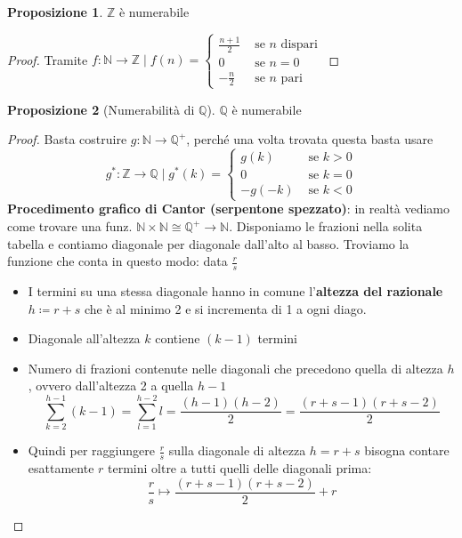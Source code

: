 \documentclass[a4paper,10pt]{article}
\theoremstyle{definition}
\newcommand{\na}{\mathbb{N}} %
\newcommand{\za}{\mathbb{Z}} %
\newcommand{\qu}{\mathbb{Q}} %
\theoremstyle{indentdefinition}
\theoremstyle{indentpostulate}
\theoremstyle{indenttheorem}
\newtheorem{prop}{Proposizione}[section]
\theoremstyle{myremark}
\theoremstyle{indentgeneral}
\begin{document}
\begin{prop}
    $\za$ è numerabile
\end{prop}

\begin{proof}
    Tramite $f:\na\to\za\mid f(n)=\begin{cases}
        \frac{n+1}{2} & \text{ se $n$ dispari}\\
        0 & \text{ se $n=0$}\\
        -\frac{n}{2} & \text{ se $n$ pari}
    \end{cases}$
\end{proof}

\begin{prop}[Numerabilità di $\qu$]\label{q-numerabile}
    $\qu$ è numerabile
\end{prop}

\begin{proof} Basta costruire  $g:\na\to \qu^+$, perché una volta trovata questa basta usare
 $$g^*:\za\to\qu\mid g^*(k)=\begin{cases}
        g(k) & \text{ se $k>0$}\\
        0 & \text{ se $k=0$}\\
        -g(-k) & \text{ se $k<0$}
    \end{cases}$$
    \textbf{Procedimento grafico di Cantor (serpentone spezzato)}: in realtà vediamo come trovare una funz. $\na\times\na\cong\qu^+\to \na$. Disponiamo le frazioni nella solita tabella e contiamo diagonale per diagonale dall'alto al basso. Troviamo la funzione che conta in questo modo: data  $\frac{r}{s}$
    \begin{itemize}
        \item I termini su una stessa diagonale hanno in comune l'\textbf{altezza del razionale} $h\coloneqq r+s$ che è al minimo 2 e si incrementa di 1 a ogni diago.
        \item Diagonale all'altezza $k$ contiene $(k-1)$ termini
        \item Numero di frazioni contenute nelle diagonali che precedono quella di altezza $h$, ovvero dall'altezza 2 a quella $h-1$
        $$\sum_{k=2}^{h-1}(k-1)=\sum_{l=1}^{h-2}l=\frac{(h-1)(h-2)}{2}=\frac{(r+s-1)(r+s-2)}{2}$$
        \item Quindi per raggiungere $\frac{r}{s}$ sulla diagonale di altezza $h=r+s$ bisogna contare esattamente $r$ termini oltre a tutti quelli delle diagonali prima:
        $$\frac{r}{s}\mapsto \frac{(r+s-1)(r+s-2)}{2}+r$$
    \end{itemize}
\end{proof}
\end{document}
